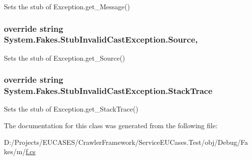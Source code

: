 Sets the stub of Exception.\-get\-\_\-\-Message()

\hypertarget{class_system_1_1_fakes_1_1_stub_invalid_cast_exception_acc8cf93e3a1647585132bb0add3cec29}{
\subsubsection[{Source}]{\setlength{\rightskip}{0pt plus 5cm}override string System.\-Fakes.\-Stub\-Invalid\-Cast\-Exception.\-Source\hspace{0.3cm}{\ttfamily [get]}, {\ttfamily [set]}}}\label{class_system_1_1_fakes_1_1_stub_invalid_cast_exception_acc8cf93e3a1647585132bb0add3cec29}


Sets the stub of Exception.\-get\-\_\-\-Source()

\hypertarget{class_system_1_1_fakes_1_1_stub_invalid_cast_exception_a4fe8fc893dbfa36e8572918658952d54}{
\subsubsection[{Stack\-Trace}]{\setlength{\rightskip}{0pt plus 5cm}override string System.\-Fakes.\-Stub\-Invalid\-Cast\-Exception.\-Stack\-Trace\hspace{0.3cm}{\ttfamily [get]}}}\label{class_system_1_1_fakes_1_1_stub_invalid_cast_exception_a4fe8fc893dbfa36e8572918658952d54}


Sets the stub of Exception.\-get\-\_\-\-Stack\-Trace()



The documentation for this class was generated from the following file\-:\begin{DoxyCompactItemize}
\item 
D\-:/\-Projects/\-E\-U\-C\-A\-S\-E\-S/\-Crawler\-Framework/\-Service\-E\-U\-Cases.\-Test/obj/\-Debug/\-Fakes/m/\hyperlink{m_2f_8cs}{f.\-cs}\end{DoxyCompactItemize}
